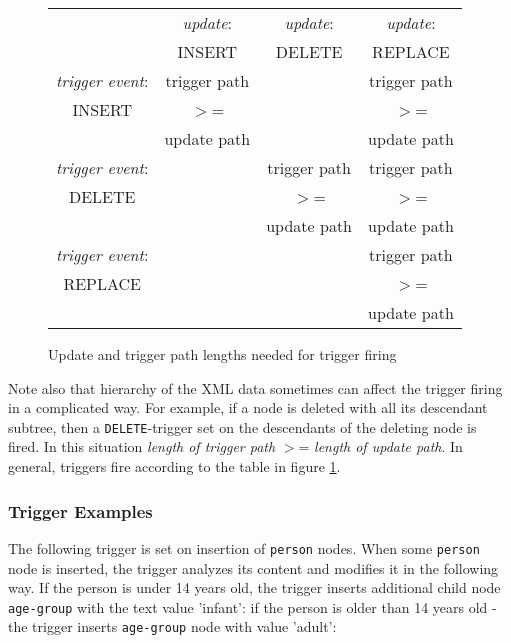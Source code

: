 \documentclass[a4paper,12pt]{article}
\begin{document}
\begin{figure}[h]
\begin{center}
{\footnotesize\begin{tabular}{|c||c|c|c|}
\hline
   & \emph{update}:  & \emph{update}:  & \emph{update}:  \\
   & INSERT   & DELETE   & REPLACE  \\
\hline
\hline
\emph{trigger event}:  & trigger path &   &  trigger path   \\
     INSERT            &    $>$=      &   &      $>$=       \\
                       & update path  &   &  update path    \\
\hline
\emph{trigger event}:  &  & trigger path &  trigger path \\
      DELETE           &  &     $>$=     &      $>$=     \\
                       &  & update path  &   update path \\
\hline
\emph{trigger event}: &  &   &  trigger path \\
      REPLACE         &  &   &      $>$=     \\
                      &  &   &  update path  \\
\hline

\end{tabular}}
\caption{\label{triggertab} Update and trigger path lengths needed for trigger
firing}
\end{center}
\end{figure}

Note also that hierarchy of the XML data sometimes can affect the trigger firing
in a complicated way. For example, if a node is deleted with all its descendant
subtree, then a \verb!DELETE!-trigger set on the descendants of the deleting
node is fired. In this situation \emph{length of trigger path} $>$= \emph{length
of update path}. In general, triggers fire according to the table in figure
\ref{triggertab}.


\subsubsection{Trigger Examples}

The following trigger is set on insertion of \verb!person! nodes. When some
\verb!person! node is inserted, the trigger analyzes its content and modifies it
in the following way. If the person is under 14 years old, the trigger inserts
additional child node \verb!age-group! with the text value 'infant': if the
person is older than 14 years old - the trigger inserts \verb!age-group! node
with value 'adult':
\end{document}
